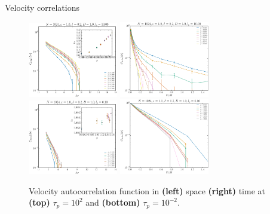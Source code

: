 \documentclass{beamer}
\begin{document}
\begin{frame}{Velocity correlations}

\begin{figure}
\centering
\includegraphics[width=0.35\textwidth]{cvvCMlog_No1024_Tl1000_Rj1000.eps}
\includegraphics[width=0.35\textwidth]{cvvtCM_No1024_Tl1000_Rj1000.eps}\\
\includegraphics[width=0.35\textwidth]{cvvCMlog_No1024_Tl1000_Rn1000.eps}
\includegraphics[width=0.35\textwidth]{cvvtCM_No1024_Tl1000_Rn1000.eps}
\caption{Velocity autocorrelation function in {\bf (left)} space {\bf (right)} time at {\bf (top)} $\tau_p = 10^2$ and {\bf (bottom)} $\tau_p = 10^{-2}$.}
\end{figure}

\end{frame}
\end{document}
